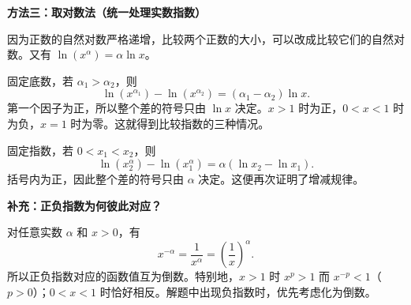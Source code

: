 \clearpage
\begin{proofbox}
\textbf{\textcolor{CProof}{方法三：取对数法（统一处理实数指数）}}



  因为正数的自然对数严格递增，比较两个正数的大小，可以改成比较它们的自然对数。又有 $\ln(x^\alpha)=\alpha\ln x$。

  固定底数，若 $\alpha_1>\alpha_2$，则
  \[
  \ln(x^{\alpha_1})-\ln(x^{\alpha_2})
     =(\alpha_1-\alpha_2)\ln x.
  \]
  第一个因子为正，所以整个差的符号只由 $\ln x$ 决定。$x>1$ 时为正，$0<x<1$ 时为负，$x=1$ 时为零。这就得到比较指数的三种情况。

  固定指数，若 $0<x_1<x_2$，则
  \[
     \ln(x_2^\alpha)-\ln(x_1^\alpha)
       =\alpha(\ln x_2-\ln x_1).
  \]
  括号内为正，因此整个差的符号只由 $\alpha$ 决定。这便再次证明了增减规律。

  \medskip
  \end{proofbox}\clearpage\begin{proofbox}

\textbf{\textcolor{CProof}{补充：正负指数为何彼此对应？}}

  对任意实数 $\alpha$ 和 $x>0$，有
  \[
    x^{-\alpha}=\frac1{x^\alpha}=\left(\frac1x\right)^\alpha.
  \]
  所以正负指数对应的函数值互为倒数。特别地，$x>1$ 时 $x^p>1$ 而 $x^{-p}<1$（$p>0$）；$0<x<1$ 时恰好相反。解题中出现负指数时，优先考虑化为倒数。
\end{proofbox}
